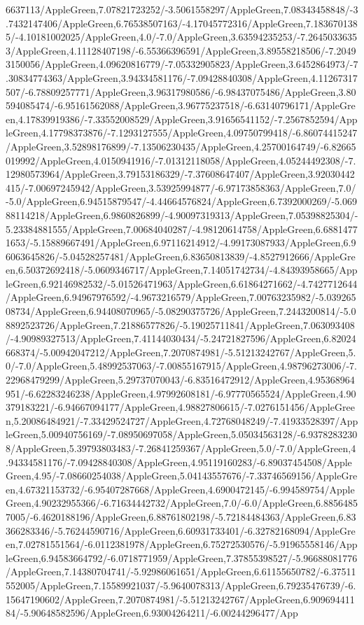 {\begin{tikzternal}
6637113/AppleGreen,7.07821723252/-3.5061558297/AppleGreen,7.08343458848/-3.7432147406/AppleGreen,6.76538507163/-4.17045772316/AppleGreen,7.1836701385/-4.10181002025/AppleGreen,4.0/-7.0/AppleGreen,3.63594235253/-7.26450336353/AppleGreen,4.11128407198/-6.55366396591/AppleGreen,3.89558218506/-7.20493150056/AppleGreen,4.09620816779/-7.05332905823/AppleGreen,3.6452864973/-7.30834774363/AppleGreen,3.94334581176/-7.09428840308/AppleGreen,4.11267317507/-6.78809257771/AppleGreen,3.96317980586/-6.98437075486/AppleGreen,3.80594085474/-6.95161562088/AppleGreen,3.96775237518/-6.63140796171/AppleGreen,4.17839919386/-7.33552008529/AppleGreen,3.91656541152/-7.2567852594/AppleGreen,4.17798373876/-7.1293127555/AppleGreen,4.09750799418/-6.86074415247/AppleGreen,3.52898176899/-7.13506230435/AppleGreen,4.25700164749/-6.82665019992/AppleGreen,4.0150941916/-7.01312118058/AppleGreen,4.05244492308/-7.12980573964/AppleGreen,3.79153186329/-7.37608647407/AppleGreen,3.92030442415/-7.00697245942/AppleGreen,3.53925994877/-6.97173858363/AppleGreen,7.0/-5.0/AppleGreen,6.94515879547/-4.44664576824/AppleGreen,6.7392000269/-5.06988114218/AppleGreen,6.9860826899/-4.90097319313/AppleGreen,7.05398825304/-5.23384881555/AppleGreen,7.00684040287/-4.98120614758/AppleGreen,6.68814771653/-5.15889667491/AppleGreen,6.97116214912/-4.99173087933/AppleGreen,6.96063645826/-5.04528257481/AppleGreen,6.83650813839/-4.8527912666/AppleGreen,6.50372692418/-5.0609346717/AppleGreen,7.14051742734/-4.84393958665/AppleGreen,6.92146982532/-5.01526471963/AppleGreen,6.61864271662/-4.7427712644/AppleGreen,6.94967976592/-4.9673216579/AppleGreen,7.00763235982/-5.03926508734/AppleGreen,6.94408070965/-5.08290375726/AppleGreen,7.2443200814/-5.08892523726/AppleGreen,7.21886577826/-5.19025711841/AppleGreen,7.063093408/-4.90989327513/AppleGreen,7.41144030434/-5.24721827596/AppleGreen,6.82024668374/-5.00942047212/AppleGreen,7.2070874981/-5.51213242767/AppleGreen,5.0/-7.0/AppleGreen,5.48992537063/-7.00855167915/AppleGreen,4.98796273006/-7.22968479299/AppleGreen,5.29737070043/-6.83516472912/AppleGreen,4.95368964951/-6.62283246238/AppleGreen,4.97992608181/-6.97770565524/AppleGreen,4.90379183221/-6.94667094177/AppleGreen,4.98827806615/-7.0276151456/AppleGreen,5.20086484921/-7.33429524727/AppleGreen,4.72768048249/-7.41933528397/AppleGreen,5.00940756169/-7.08950697058/AppleGreen,5.05034563128/-6.93782832308/AppleGreen,5.39793803483/-7.26841259367/AppleGreen,5.0/-7.0/AppleGreen,4.94334581176/-7.09428840308/AppleGreen,4.95119160283/-6.89037454508/AppleGreen,4.95/-7.08660254038/AppleGreen,5.04143557676/-7.33746569156/AppleGreen,4.67321153732/-6.95407287668/AppleGreen,4.6900472145/-6.994589754/AppleGreen,4.90232955366/-6.71634442732/AppleGreen,7.0/-6.0/AppleGreen,6.88564857005/-6.4620188196/AppleGreen,6.88761802198/-5.72184484363/AppleGreen,6.83366283346/-5.76244590716/AppleGreen,6.60931733401/-6.32782168094/AppleGreen,7.02781551564/-6.0112381978/AppleGreen,6.75272530576/-5.91965558146/AppleGreen,6.94583664792/-6.0718771959/AppleGreen,7.37855398527/-5.96688081776/AppleGreen,7.14380704741/-5.92986061651/AppleGreen,6.61155650782/-6.37511552005/AppleGreen,7.15589921037/-5.9640078313/AppleGreen,6.79235476739/-6.15647190602/AppleGreen,7.2070874981/-5.51213242767/AppleGreen,6.90969441184/-5.90648582596/AppleGreen,6.93004264211/-6.00244296477/App
\end{tikzternal}}
